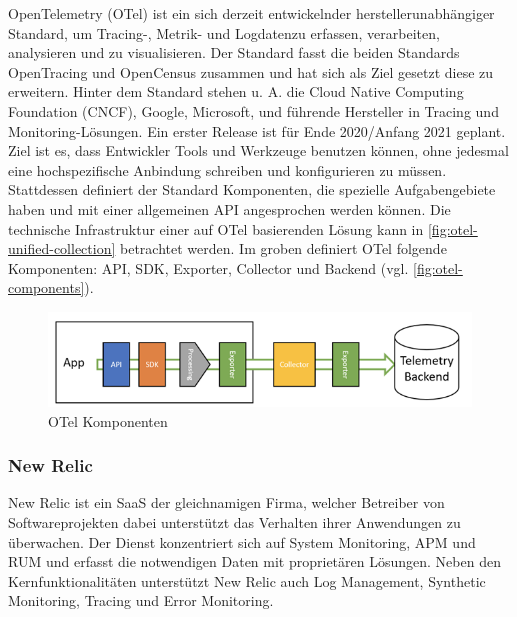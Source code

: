 OpenTelemetry (OTel) \cite{OpenTelemetry} ist ein sich derzeit entwickelnder herstellerunabhängiger Standard, um Tracing-, Metrik- und Logdaten\footnotemark zu erfassen, verarbeiten, analysieren und zu visualisieren. Der Standard fasst die beiden Standards OpenTracing und OpenCensus \cite{OpenCensus} zusammen und hat sich als Ziel gesetzt diese zu erweitern. Hinter dem Standard stehen u. A. die Cloud Native Computing Foundation (CNCF), Google, Microsoft, und führende Hersteller in Tracing und Monitoring-Lösungen. Ein erster Release ist für Ende 2020/Anfang 2021 geplant. Ziel ist es, dass Entwickler Tools und Werkzeuge benutzen können, ohne jedesmal eine hochspezifische Anbindung schreiben und konfigurieren zu müssen. Stattdessen definiert der Standard Komponenten, die spezielle Aufgabengebiete haben und mit einer allgemeinen API angesprochen werden können. Die technische Infrastruktur einer auf OTel basierenden Lösung kann in \autoref{fig:otel-unified-collection} betrachtet werden. Im groben definiert OTel folgende Komponenten: API, SDK, Exporter, Collector und Backend (vgl. \autoref{fig:otel-components}).


\begin{figure}[H]
	\centering
	\includegraphics[width=0.55\linewidth]{img/03_methoden/dynatrace_otel-components.png}
	\caption{OTel Komponenten \cite{DynatraceOTelComponents}}
	\label{fig:otel-components}
\end{figure}

\subsubsection{New Relic}

New Relic \cite{NewRelic} ist ein SaaS der gleichnamigen Firma, welcher Betreiber von Softwareprojekten dabei unterstützt das Verhalten ihrer Anwendungen zu überwachen. Der Dienst konzentriert sich auf System Monitoring, APM und RUM und erfasst die notwendigen Daten mit proprietären Lösungen. Neben den Kernfunktionalitäten unterstützt New Relic auch Log Management, Synthetic Monitoring, Tracing und Error Monitoring.

